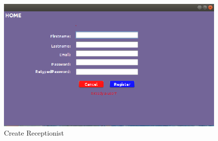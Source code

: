 \documentclass[11 pt]{article}
\begin{document}
\begin{figure}[h]
\centering
\includegraphics[width=\linewidth]{new_receptionist.png}
\caption{Create Receptionist}
\label{fig:Create New Receptionist}
\end{figure}
\clearpage
\end{document}
